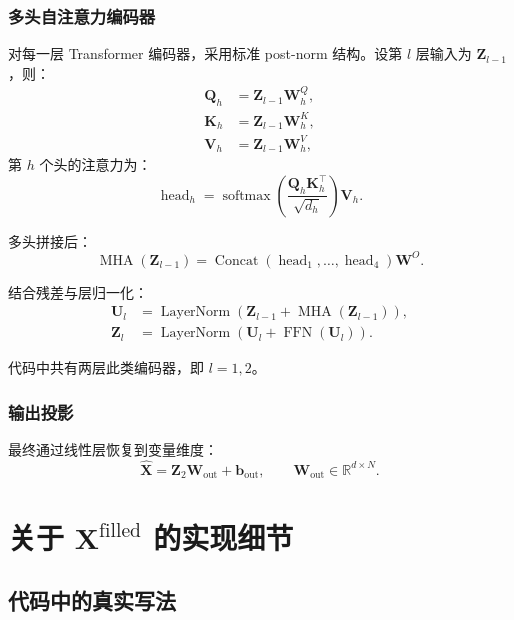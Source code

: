 \documentclass[UTF8]{ctexart}
\begin{document}
\subsubsection{多头自注意力编码器}

对每一层 Transformer 编码器，采用标准 post-norm 结构。设第 $l$ 层输入为 $\bm{Z}_{l-1}$，则：
\begin{align}
    \bm{Q}_h &= \bm{Z}_{l-1}\bm{W}_h^Q, \\
    \bm{K}_h &= \bm{Z}_{l-1}\bm{W}_h^K, \\
    \bm{V}_h &= \bm{Z}_{l-1}\bm{W}_h^V,
\end{align}
第 $h$ 个头的注意力为：
\begin{equation}
    \operatorname{head}_h
    =
    \operatorname{softmax}\!\left(
        \frac{\bm{Q}_h \bm{K}_h^\top}{\sqrt{d_h}}
    \right)\bm{V}_h.
\end{equation}

多头拼接后：
\begin{equation}
    \operatorname{MHA}(\bm{Z}_{l-1})
    =
    \operatorname{Concat}(\operatorname{head}_1,\dots,\operatorname{head}_4)\bm{W}^O.
\end{equation}

结合残差与层归一化：
\begin{align}
    \bm{U}_l &= \operatorname{LayerNorm}(\bm{Z}_{l-1} + \operatorname{MHA}(\bm{Z}_{l-1})), \\
    \bm{Z}_l &= \operatorname{LayerNorm}(\bm{U}_l + \operatorname{FFN}(\bm{U}_l)).
\end{align}

代码中共有两层此类编码器，即 $l=1,2$。

\subsubsection{输出投影}

最终通过线性层恢复到变量维度：
\begin{equation}
    \hat{\bm{X}} = \bm{Z}_2 \bm{W}_{\text{out}} + \bm{b}_{\text{out}},
    \qquad \bm{W}_{\text{out}} \in \mathbb{R}^{d \times N}.
\end{equation}

\section{关于 \texorpdfstring{$\bm{X}^{\text{filled}}$}{Xfilled} 的实现细节}

\subsection{代码中的真实写法}
\end{document}
